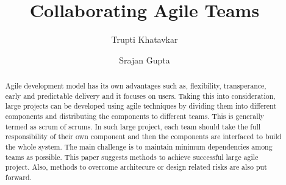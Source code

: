 \documentclass[sigconf]{acmart}
\begin{document}
%
\title{Collaborating Agile Teams}

%

\author{Trupti Khatavkar}

\author{Srajan Gupta}

%
\begin{abstract}
Agile development model has its own advantages such as, flexibility, transperance, early and predictable delivery and it focuses on users. Taking this into consideration, large projects can be developed using agile techniques by dividing them into different components and distributing the components to different teams. This is generally termed as scrum of scrums. In such large project, each team should take the full responsibility of their own component and then the components are interfaced to build the whole system. The main challenge is to maintain minimum dependencies among teams as possible. This paper suggests methods to achieve successful large agile project. Also, methods to overcome architecure or design related risks are also put forward.
\end{abstract}


%

%


%
\maketitle
\end{document}
